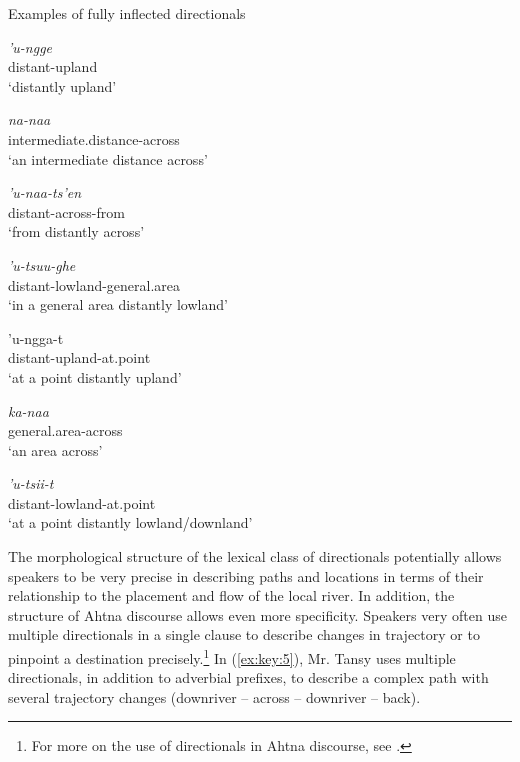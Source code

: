 \begin{exe}
\ex Examples of fully inflected directionals \label{berez-ex4}

\begin{xlist}


\ex \gll \textit{’u-ngge} \\
distant-upland  \\
\glt ‘distantly upland’


\ex \gll \textit{na-naa} \\
intermediate.distance-across  \\
\glt ‘an intermediate distance across’

\ex \gll \textit{’u-naa-ts’en}\\
distant-across-from \\
\glt ‘from distantly across’

\ex \gll \textit{’u-tsuu-ghe}\\
distant-lowland-general.area \\
\glt ‘in a general area distantly lowland’

\ex \gll ’u-ngga-t\\
distant-upland-at.point \\
\glt ‘at a point distantly upland’

\ex \gll \textit{ka-naa}\\
general.area-across \\
\glt ‘an area across’

\ex \gll \textit{’u-tsii-t}\\
distant-lowland-at.point \\
\glt ‘at a point distantly lowland/downland’

\end{xlist}

\end{exe}

\noindent
The morphological structure of the lexical class of directionals potentially allows speakers to be very precise in describing paths and locations in terms of their relationship to the placement and flow of the local river. In addition, the structure of Ahtna discourse allows even more specificity. Speakers very often use multiple directionals in a single clause to describe changes in trajectory or to pinpoint a destination precisely.\footnote{For more on the use of directionals in Ahtna discourse, see \citet{Berez2011,Berez2014}.} In (\ref{ex:key:5}), Mr. Tansy uses multiple directionals, in addition to adverbial prefixes, to describe a complex path with several trajectory changes (downriver – across – downriver – back).

